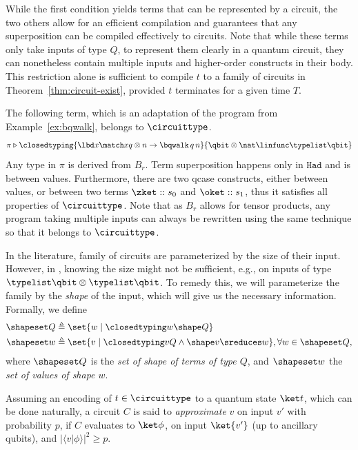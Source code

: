 While the first condition yields terms that can be represented
by a circuit, the two others allow for an efficient compilation and 
guarantees that any superposition can be compiled effectively to circuits.
Note that while these terms only take inputs of type $Q$, to represent
them clearly in a quantum circuit, they can nonetheless contain
multiple inputs and higher-order constructs in their body.
This restriction alone is sufficient to compile $t$ to a family of circuits in
Theorem~\ref{thm:circuit-exist}, provided $t$ terminates for a given time $T$.

\begin{example}
  \label{ex:bqwalk-adapt}
  The following term, which is an adaptation of the program from
  Example~\ref{ex:bqwalk}, belongs to $\circuittype$. 
  \[
    \pi \triangleright \closedtyping {\lbd x \match x {q \otimes n \to
    \bqwalk\,q\,n}} {\qbit \otimes \nat \linfunc \typelist \qbit}
  \]
  Any type in $\pi$ is derived from $B_r$. Term superposition happens only in
  $\mathtt{Had}$ and is between values. Furthermore, there are two qcase
  constructs, either between values, or between two terms $\zket :: s_0$ and
  $\oket :: s_1$, thus it satisfies all properties of $\circuittype$. Note that
  as $B_r$ allows for tensor products, any program taking multiple inputs can
  always be rewritten using the same technique so that it belongs to
  $\circuittype$.
\end{example}

In the literature, family of circuits are parameterized by the size
of their input. However, in \hyrql{}, knowing the size might not be sufficient,
e.g., on inputs of type $\typelist \qbit \otimes \typelist \qbit$. 
To remedy this, we will parameterize the family by the \emph{shape} of the
input, which will give us the necessary information. Formally, we define
\[
  \begin{aligned}
    \shapeset Q &\triangleq \set{w \mid \closedtyping w \shape Q} \\
    \shapeset w &\triangleq \set{v \mid \closedtyping v Q \wedge \shape v
    \sreduces w}, \forall w \in \shapeset Q,
  \end{aligned}
\]
where $\shapeset Q$ is the \emph{set of shape of terms of type $Q$}, and
$\shapeset w$ the \emph{set of values of shape $w$}.

Assuming an encoding of $t \in \circuittype$ to a quantum state $\ket t$, which
can be done naturally, a circuit $C$ is said to \emph{approximate} $v$ on input
$v'$ with probability $p$, if $C$ evaluates to $\ket \phi$, on input $\ket{v'}$
(up to ancillary qubits), and $\lvert \langle v | \phi \rangle \rvert^2 \geq
p$.

